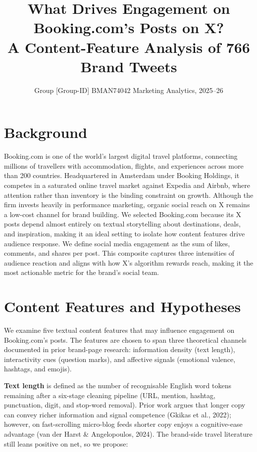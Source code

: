 \documentclass[12pt,a4paper]{article}
\title{What Drives Engagement on Booking.com's Posts on X?\\[0.3em]
\large A Content-Feature Analysis of 766 Brand Tweets}
\author{Group [Group-ID] \quad BMAN74042 Marketing Analytics, 2025--26}
\date{}
\begin{document}
\maketitle

\section{Background}

Booking.com is one of the world's largest digital travel platforms, connecting millions of travellers with accommodation, flights, and experiences across more than 200 countries. Headquartered in Amsterdam under Booking Holdings, it competes in a saturated online travel market against Expedia and Airbnb, where attention rather than inventory is the binding constraint on growth. Although the firm invests heavily in performance marketing, organic social reach on X remains a low-cost channel for brand building. We selected Booking.com because its X posts depend almost entirely on textual storytelling about destinations, deals, and inspiration, making it an ideal setting to isolate how content features drive audience response. We define social media engagement as the sum of likes, comments, and shares per post. This composite captures three intensities of audience reaction and aligns with how X's algorithm rewards reach, making it the most actionable metric for the brand's social team.

\section{Content Features and Hypotheses}

We examine five textual content features that may influence engagement on Booking.com's posts. The features are chosen to span three theoretical channels documented in prior brand-page research: information density (text length), interactivity cues (question marks), and affective signals (emotional valence, hashtags, and emojis).

\textbf{Text length} is defined as the number of recognisable English word tokens remaining after a six-stage cleaning pipeline (URL, mention, hashtag, punctuation, digit, and stop-word removal). Prior work argues that longer copy can convey richer information and signal competence (Gkikas et al., 2022); however, on fast-scrolling micro-blog feeds shorter copy enjoys a cognitive-ease advantage (van der Harst \& Angelopoulos, 2024). The brand-side travel literature still leans positive on net, so we propose:
\end{document}
